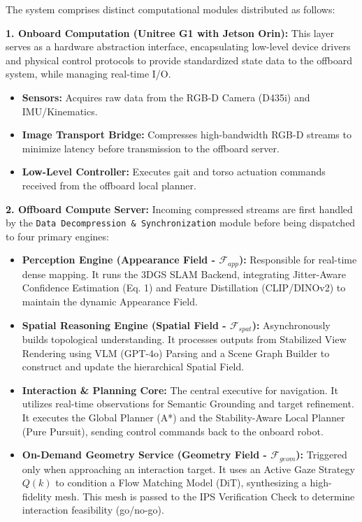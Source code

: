 \documentclass[conference]{IEEEtran}
\begin{document}
The system comprises distinct computational modules distributed as follows:

\noindent \textbf{1. Onboard Computation (Unitree G1 with Jetson Orin):}
This layer serves as a hardware abstraction interface, encapsulating low-level device drivers and physical control protocols to provide standardized state data to the offboard system, while managing real-time I/O.
\begin{itemize}
    \item \textbf{Sensors:} Acquires raw data from the RGB-D Camera (D435i) and IMU/Kinematics.
    \item \textbf{Image Transport Bridge:} Compresses high-bandwidth RGB-D streams to minimize latency before transmission to the offboard server.
    \item \textbf{Low-Level Controller:} Executes gait and torso actuation commands received from the offboard local planner.
\end{itemize}

\noindent \textbf{2. Offboard Compute Server:}
Incoming compressed streams are first handled by the \texttt{Data Decompression \& Synchronization} module before being dispatched to four primary engines:

\begin{itemize}
    \item \textbf{Perception Engine (Appearance Field - $\mathcal{F}_{app}$):} Responsible for real-time dense mapping. It runs the 3DGS SLAM Backend, integrating Jitter-Aware Confidence Estimation (Eq. 1) and Feature Distillation (CLIP/DINOv2) to maintain the dynamic Appearance Field.

    \item \textbf{Spatial Reasoning Engine (Spatial Field - $\mathcal{F}_{spat}$):} Asynchronously builds topological understanding. It processes outputs from Stabilized View Rendering using VLM (GPT-4o) Parsing and a Scene Graph Builder to construct and update the hierarchical Spatial Field.

    \item \textbf{Interaction \& Planning Core:} The central executive for navigation. It utilizes real-time observations for Semantic Grounding and target refinement. It executes the Global Planner (A*) and the Stability-Aware Local Planner (Pure Pursuit), sending control commands back to the onboard robot.

    \item \textbf{On-Demand Geometry Service (Geometry Field - $\mathcal{F}_{geom}$):} Triggered only when approaching an interaction target. It uses an Active Gaze Strategy $Q(k)$ to condition a Flow Matching Model (DiT), synthesizing a high-fidelity mesh. This mesh is passed to the IPS Verification Check to determine interaction feasibility (go/no-go).
\end{itemize}
\end{document}
